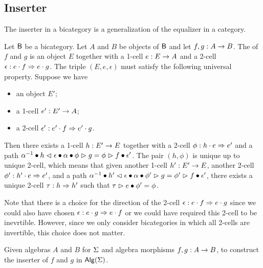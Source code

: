 \subsection{Inserter}
The inserter in a bicategory is a generalization of the equalizer in
a category.

\begin{definition}\label{def:inserter}
Let $\B$ be a bicategory. Let $A$ and $B$ be objects of $\B$ and let
$f,g : A \onecell B$. The  of $f$ and $g$ is an
object $E$ together with a 1-cell $e : E \onecell A$ and a 2-cell
$\epsilon : e \cdot f\twocell e \cdot g$.
The triple $(E,e,\epsilon)$ must satisfy the following universal
property. Suppose we have
\begin{itemize}
\item an object $E'$;
\item a 1-cell $e' : E' \onecell A$;
\item a 2-cell $\epsilon' : e' \cdot f \twocell e' \cdot g$.
\end{itemize}
Then there exists a 1-cell $h : E' \onecell E$ together with a 2-cell
$\phi : h \cdot e \twocell e'$ and a path $\rassoc{h}{e}{f} \vcomp
h \whiskerl \epsilon \vcomp \lassoc{h}{e}{g} \vcomp \phi \whiskerr g
= \phi \whiskerr f \vcomp \epsilon'$.
The pair $(h,\phi)$ is unique up to unique 2-cell, which means that
given another 1-cell $h' : E' \onecell E$, another 2-cell $\phi' :
h' \cdot e \twocell e'$, and a path $\rassoc{h'}{e}{f} \vcomp
h' \whiskerl \epsilon \vcomp \lassoc{h'}{e}{g} \vcomp \phi' \whiskerr g
= \phi' \whiskerr f \vcomp \epsilon'$, there exists a unique 2-cell $\tau : h
\twocell h'$ such that $\tau \whiskerr e \vcomp \phi' = \phi$.
\end{definition}

Note that there is a choice for the direction of the 2-cell $\epsilon : e \cdot f\twocell e \cdot g$ since we could also have chosen $\epsilon : e \cdot g\twocell e \cdot f$ or we could have required this 2-cell to be inevrtible.
However, since we only consider bicategories in which all 2-cells are invertible, this choice does not matter.

\begin{problem}
\label{prob:inserter}
Given algebras $A$ and $B$ for $\sign$ and
algebra morphisms $f,g : A \onecell B$, to construct the inserter of $f$ and $g$ in $\alg(\sign)$.
\end{problem}

